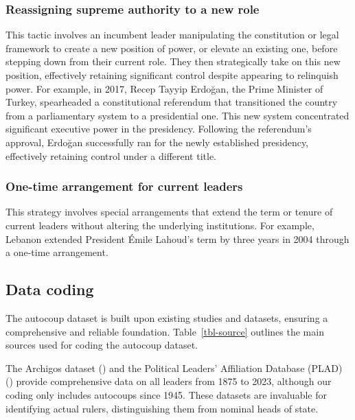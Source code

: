 \documentclass[
  12pt,
]{report}
\begin{document}
\subsubsection*{Reassigning supreme authority to a new
role}\label{reassigning-supreme-authority-to-a-new-role}

This tactic involves an incumbent leader manipulating the constitution
or legal framework to create a new position of power, or elevate an
existing one, before stepping down from their current role. They then
strategically take on this new position, effectively retaining
significant control despite appearing to relinquish power. For example,
in 2017, Recep Tayyip Erdoğan, the Prime Minister of Turkey, spearheaded
a constitutional referendum that transitioned the country from a
parliamentary system to a presidential one. This new system concentrated
significant executive power in the presidency. Following the
referendum's approval, Erdoğan successfully ran for the newly
established presidency, effectively retaining control under a different
title.

\subsubsection*{One-time arrangement for current
leaders}\label{one-time-arrangement-for-current-leaders}

This strategy involves special arrangements that extend the term or
tenure of current leaders without altering the underlying institutions.
For example, Lebanon extended President Émile Lahoud's term by three
years in 2004 through a one-time arrangement.

\subsection{Data coding}\label{data-coding}

The autocoup dataset is built upon existing studies and datasets,
ensuring a comprehensive and reliable foundation. Table~\ref{tbl-source}
outlines the main sources used for coding the autocoup dataset.

The Archigos dataset () and the Political Leaders' Affiliation Database (PLAD)
() provide
comprehensive data on all leaders from 1875 to 2023, although our coding
only includes autocoups since 1945. These datasets are invaluable for
identifying actual rulers, distinguishing them from nominal heads of
state.
\end{document}
